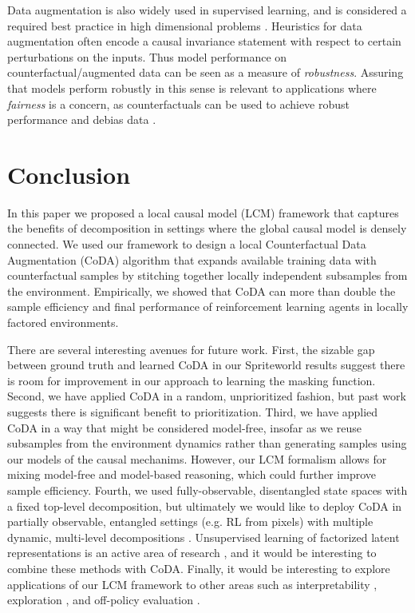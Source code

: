 \documentclass{article}
\begin{document}
Data augmentation is also widely used in supervised learning, and is considered a required best practice in high dimensional problems \citep{krizhevsky2012imagenet,laskin2020reinforcement,perez2017effectiveness}.
Heuristics for data augmentation often encode a causal invariance statement with respect to certain perturbations on the inputs.
Thus model performance on counterfactual/augmented data can be seen as a measure of \emph{robustness}. 
Assuring that models perform robustly in this sense is relevant 
to applications where \emph{fairness} is a concern, as counterfactuals can be used to achieve robust performance and debias data
\citep{garg2019counterfactual,park2018reducing,bolukbasi2016man}.

\section{Conclusion}
In this paper we proposed a local causal model (LCM) framework that captures the benefits of decomposition in settings where the global causal model is densely connected. We used our framework to design a local Counterfactual Data Augmentation (CoDA) algorithm that expands available training data with counterfactual samples by stitching together locally independent subsamples from the environment. Empirically, we showed that CoDA can more than double the sample efficiency and final performance of reinforcement learning agents in locally factored environments. 

There are several interesting avenues for future work. 
First, the sizable gap between ground truth and learned CoDA in our Spriteworld results suggest there is room for improvement in our approach to learning the masking function. Second, we have applied CoDA in a random, unprioritized fashion, but past work \cite{andrychowicz2017hindsight,schaul2015prioritized} suggests there is significant benefit to prioritization. Third, we have applied CoDA in a way that might be considered model-free, insofar as we reuse subsamples from the environment dynamics rather than generating samples using our models of the causal mechanims. However, our LCM formalism allows for mixing model-free and model-based reasoning, which could further improve sample efficiency. Fourth, we used fully-observable, disentangled state spaces with a fixed top-level decomposition, but ultimately we would like to deploy CoDA in partially observable, entangled settings (e.g. RL from pixels) with multiple dynamic, multi-level decompositions \cite{higgins2018scan,esmaeili2019structured,zaheer2017deep}. Unsupervised learning of factorized latent representations is an active area of research \cite{dundar2020unsupervised,kipf2019contrastive,locatello2018challenging,locatello2020weakly,watters2019cobra}, and it would be interesting to combine these methods with CoDA. 
Finally, it would be interesting to explore applications of our LCM framework to other areas such as interpretability \cite{lyu2019sdrl,mott2019towards}, exploration \cite{nair2018visual,wang2019monkeys}, and off-policy evaluation \cite{thomas2016data}. 
\end{document}
